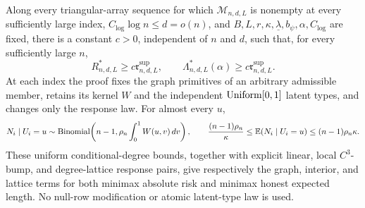 Along every triangular-array sequence for which \(\mathcal M_{n,d,L}\) is nonempty at every sufficiently large index, \(C_{\log}\log n\leq d=o(n)\), and \(B,L,r,\kappa,\underline\lambda,b_\psi,\alpha,C_{\log}\) are fixed, there is a constant \(c>0\), independent of \(n\) and \(d\), such that, for every sufficiently large \(n\),
\[
 R^*_{n,d,L}\geq c\mathfrak r^{\mathrm{sup}}_{n,d,L},
 \qquad
 \Lambda^*_{n,d,L}(\alpha)\geq c\mathfrak r^{\mathrm{sup}}_{n,d,L}.
\]
At each index the proof fixes the graph primitives of an arbitrary admissible member, retains its kernel \(W\) and the independent \({\rm Uniform}[0,1]\) latent types, and changes only the response law.  For almost every \(u\),
\[
 N_i\mid U_i=u
 \sim{\rm Binomial}\!\left(n-1,\rho_n\int_0^1W(u,v)\,dv\right),
 \qquad
 \frac{(n-1)\rho_n}{\kappa}
 \leq\mathbb E(N_i\mid U_i=u)
 \leq(n-1)\rho_n\kappa.
\]
These uniform conditional-degree bounds, together with explicit linear, local \(C^3\)-bump, and degree-lattice response pairs, give respectively the graph, interior, and lattice terms for both minimax absolute risk and minimax honest expected length.  No null-row modification or atomic latent-type law is used.